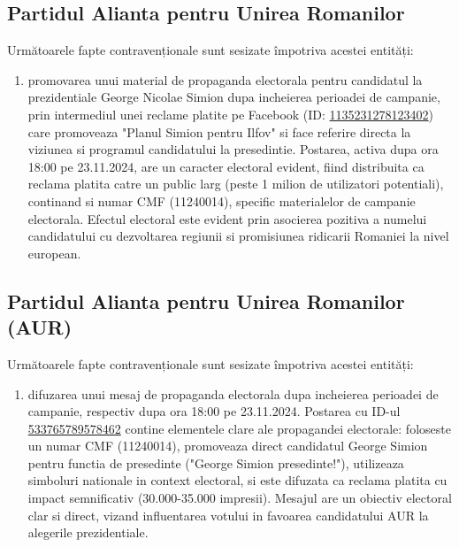 \documentclass[a4paper,12pt]{article}
\begin{document}
\vspace{0.5cm}

\subsection{Partidul Alianta pentru Unirea Romanilor}
Următoarele fapte contravenționale sunt sesizate împotriva acestei entități:

\begin{enumerate}[leftmargin=*, label=\arabic*.)]
    \item promovarea unui material de propaganda electorala pentru candidatul la prezidentiale George Nicolae Simion dupa incheierea perioadei de campanie, prin intermediul unei reclame platite pe Facebook (ID: \href{https://www.facebook.com/ads/library/?id=1135231278123402}{1135231278123402}) care promoveaza "Planul Simion pentru Ilfov" si face referire directa la viziunea si programul candidatului la presedintie. Postarea, activa dupa ora 18:00 pe 23.11.2024, are un caracter electoral evident, fiind distribuita ca reclama platita catre un public larg (peste 1 milion de utilizatori potentiali), continand si numar CMF (11240014), specific materialelor de campanie electorala. Efectul electoral este evident prin asocierea pozitiva a numelui candidatului cu dezvoltarea regiunii si promisiunea ridicarii Romaniei la nivel european.
\end{enumerate}

\vspace{0.5cm}

\subsection{Partidul Alianta pentru Unirea Romanilor (AUR)}
Următoarele fapte contravenționale sunt sesizate împotriva acestei entități:

\begin{enumerate}[leftmargin=*, label=\arabic*.)]
    \item difuzarea unui mesaj de propaganda electorala dupa incheierea perioadei de campanie, respectiv dupa ora 18:00 pe 23.11.2024. Postarea cu ID-ul \href{https://www.facebook.com/ads/library/?id=533765789578462}{533765789578462} contine elementele clare ale propagandei electorale: foloseste un numar CMF (11240014), promoveaza direct candidatul George Simion pentru functia de presedinte ("George Simion presedinte!"), utilizeaza simboluri nationale in context electoral, si este difuzata ca reclama platita cu impact semnificativ (30.000-35.000 impresii). Mesajul are un obiectiv electoral clar si direct, vizand influentarea votului in favoarea candidatului AUR la alegerile prezidentiale.
\end{enumerate}
\end{document}
